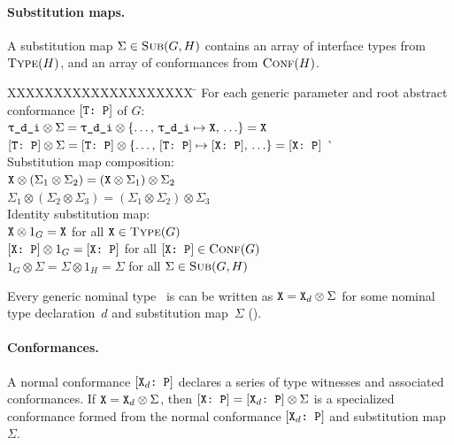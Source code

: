 \documentclass[../generics]{subfiles}
\begin{document}
\paragraph{Substitution maps.} A substitution map $\Sigma\in\textsc{Sub}({G, H})$ contains an array of interface types from $\textsc{Type}({H})$, and an array of conformances from $\textsc{Conf}({H})$.

\begin{tabbing}
XXXXXXXXXXXXXXXXXXXX \= \kill
For each generic parameter  and root abstract conformance $[\texttt{T:~P}]$ of $G$:\\
\qquad $\ttgp{d}{i} \otimes \Sigma = \ttgp{d}{i} \otimes\SubstMap{\ldots,\,\SubstType{\ttgp{d}{i}}{X},\,\ldots} = \tX$\\
\qquad $[\texttt{T:~P}] \otimes \Sigma = [\texttt{T:~P}] \otimes \{\ldots,\,[\texttt{T:~P}] \mapsto [\texttt{X:~P}],\,\ldots\} = [\texttt{X:~P}]$ \` \\[\medskipamount]
Substitution map composition:\\
\qquad $\texttt{X} \otimes (\Sigma_1 \otimes \Sigma_2) = (\texttt{X} \otimes \Sigma_1) \otimes \Sigma_2$ \\
\qquad $\Sigma_1 \otimes (\Sigma_2 \otimes \Sigma_3) = (\Sigma_1 \otimes \Sigma_2) \otimes \Sigma_3$\\[\medskipamount]
Identity substitution map:\\
\qquad $\texttt{X} \otimes 1_G = \texttt{X}$ \> for all $\texttt{X}\in\textsc{Type}({G})$\\
\qquad $[\texttt{X:~P}] \otimes 1_G = [\texttt{X:~P}]$ \> for all $[\texttt{X:~P}]\in\textsc{Conf}({G})$\\
\qquad $1_G \otimes \Sigma = \Sigma \otimes 1_H = \Sigma$ \> for all $\Sigma\in\textsc{Sub}({G, H})$
\end{tabbing}
Every generic nominal type \tX\ is can be written as $\texttt{X}=\texttt{X}_d\otimes\Sigma$ for some nominal type declaration~$d$ and substitution map~$\Sigma$ ().

\paragraph{Conformances.} A normal conformance $[\texttt{$\texttt{X}_d$:~P}]$ declares a series of type witnesses and associated conformances. If $\texttt{X}=\texttt{X}_d\otimes\Sigma$, then $[\texttt{X:~P}]=[\texttt{$\texttt{X}_d$:~P}] \otimes \Sigma$ is a specialized conformance formed from the normal conformance $[\texttt{$\texttt{X}_d$:~P}]$ and substitution map $\Sigma$.
\end{document}
